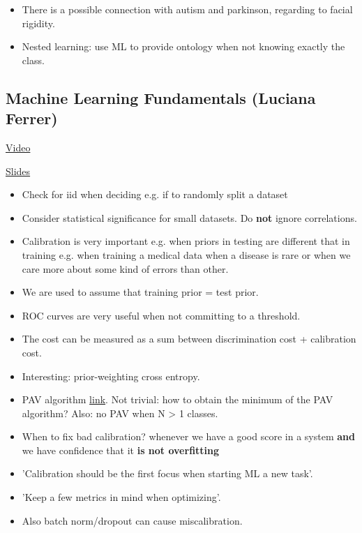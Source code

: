 \documentclass[12pt, english]{article}
\begin{document}
\begin{itemize}
\item There is a possible connection with autism and parkinson, regarding to facial rigidity.
\item Nested learning: use ML to provide ontology when not knowing exactly the class.
\end{itemize}


\subsection{Machine Learning Fundamentals (Luciana Ferrer)}
\href{http://tv.vera.com.uy/video/55289}{Video}

\href{https://drive.google.com/file/d/1j7lykMniKwBh1lQJFCbW77PjOQEaXqHM/view?usp=sharing}{Slides}

\begin{itemize}
\item Check for iid when deciding e.g. if to randomly split a dataset
\item Consider statistical significance for small datasets. Do \textbf{not} ignore correlations.
\item Calibration is very important e.g. when priors in testing are different that in training e.g. when training a medical data when a disease is rare or when we care more about some kind of errors than other.
\item We are used to assume that training prior = test prior.
\item ROC curves are very useful when not  committing to a threshold.
\item The cost can be measured as a sum between discrimination cost + calibration cost.
\item Interesting: prior-weighting cross entropy.
\item PAV algorithm \href{stat.wikia.com/wiki/Isotonic_regression#Pool_Adjacent_Violators_Algorithm}{link}. Not trivial: how to obtain the minimum of the PAV algorithm? Also: no PAV when N > 1 classes.
\item When to fix bad calibration? whenever we have a good score in a system \textbf{and} we have confidence that it \textbf{is not overfitting}
\item 'Calibration should be the first focus when starting ML a new task'.
\item 'Keep a few metrics in mind when optimizing'.
\item Also batch norm/dropout can cause miscalibration.
\end{itemize}
\end{document}
